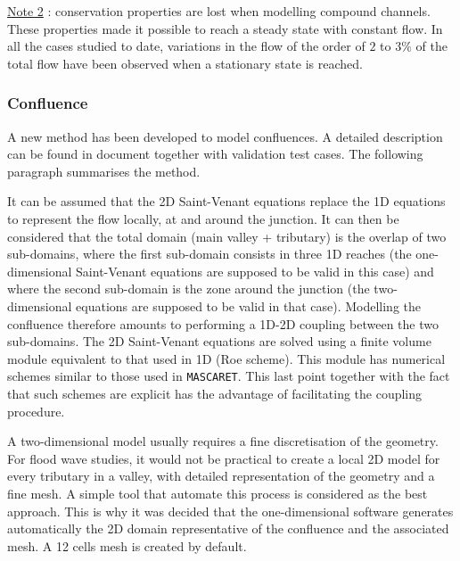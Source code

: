 \vspace{0.5cm}

\underline{Note 2} : conservation properties are lost when modelling compound channels. These properties made it possible to reach a steady state with constant flow. In all the cases studied to date, variations in the flow of the order of $2$ to $3\%$ of the total flow have been observed when a stationary state is reached.

\subsubsection{Confluence}

A new method has been developed to model confluences. A detailed description can be found in document \cite{MAUREL96} together with validation test cases. The following paragraph summarises the method.

\vspace{0.5cm}

It can be assumed that the 2D Saint-Venant equations replace the 1D equations to represent the flow locally, at and around the junction. It can then be considered that the total domain (main valley + tributary) is the overlap of two sub-domains, where the first sub-domain consists in three 1D reaches (the one-dimensional Saint-Venant equations are supposed to be valid in this case) and where the second sub-domain is the zone around the junction (the two-dimensional equations are supposed to be valid in that case). Modelling the confluence therefore amounts to performing a 1D-2D coupling between the two sub-domains. The 2D Saint-Venant equations are solved using a finite volume module equivalent to that used in 1D (Roe scheme). This module has numerical schemes similar to those used in \texttt{MASCARET}. This last point together with the fact that such schemes are explicit has the advantage of facilitating the coupling procedure.

\vspace{0.5cm}

A two-dimensional model usually requires a fine discretisation of the geometry. For flood wave studies, it would not be practical to create a local 2D model for every tributary in a valley, with detailed representation of the geometry and a fine mesh. A simple tool that automate this process is considered as the best approach. 
This is why it was decided that the one-dimensional software generates automatically the 2D domain representative of the confluence and the associated mesh. A 12 cells mesh is created by default.

